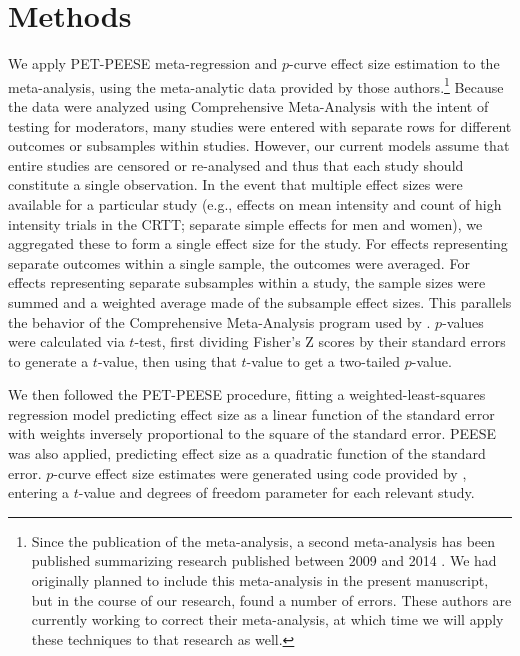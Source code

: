 \documentclass[man]{apa6}
\begin{document}
\section{Methods}
We apply PET-PEESE meta-regression and $p$-curve effect size estimation to the \citet{Anderson:etal:2010} meta-analysis, using the meta-analytic data provided by those authors.\footnote{Since the publication of the \citet{Anderson:etal:2010} meta-analysis, a second meta-analysis has been published summarizing research published between 2009 and 2014 \citet{Greitemeyer:Mugge:2014}. We had originally planned to include this meta-analysis in the present manuscript, but in the course of our research, found a number of errors. These authors are currently working to correct their meta-analysis, at which time we will apply these techniques to that research as well.} 
Because the data were analyzed using Comprehensive Meta-Analysis with the intent of testing for moderators, many studies were entered with separate rows for different outcomes or subsamples within studies. However, our current models assume that entire studies are censored or re-analysed and thus that each study should constitute a single observation. In the event that multiple effect sizes were available for a particular study (e.g., effects on mean intensity and count of high intensity trials in the CRTT; separate simple effects for men and women), we aggregated these to form a single effect size for the study. For effects representing separate outcomes within a single sample, the outcomes were averaged. For effects representing separate subsamples within a study, the sample sizes were summed and a weighted average made of the subsample effect sizes. This parallels the behavior of the Comprehensive Meta-Analysis program used by \citet{Anderson:etal:2010}. $p$-values were calculated via $t$-test, first dividing Fisher's Z scores by their standard errors to generate a $t$-value, then using that $t$-value to get a two-tailed $p$-value.

We then followed the PET-PEESE procedure, fitting a weighted-least-squares regression model predicting effect size as a linear function of the standard error with weights inversely proportional to the square of the standard error. PEESE was also applied, predicting effect size as a quadratic function of the standard error. $p$-curve effect size estimates were generated using code provided by \citet{Simonsohn:etal:2014}, entering a $t$-value and degrees of freedom parameter for each relevant study.
\end{document}
